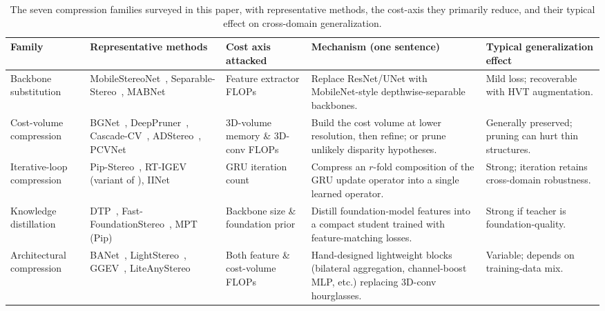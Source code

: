 \begin{table}[!htbp]
\centering
\caption{The seven compression families surveyed in this paper, with representative methods, the cost-axis they primarily reduce, and their typical effect on cross-domain generalization.}
\label{tab:compression_families}
\renewcommand{\arraystretch}{1.15}
\footnotesize
\begin{tabular}{p{2.6cm}p{4.0cm}p{2.4cm}p{4.0cm}p{2.6cm}}
\toprule
\textbf{Family} & \textbf{Representative methods} & \textbf{Cost axis attacked} & \textbf{Mechanism (one sentence)} & \textbf{Typical generalization effect} \\
\midrule
Backbone substitution &
MobileStereoNet~\cite{shamsafar2022mobilestereonet}, Separable-Stereo~\cite{rahim2021separable}, MABNet~\cite{xing2020mabnet} &
Feature extractor FLOPs &
Replace ResNet/UNet with MobileNet-style depthwise-separable backbones. &
Mild loss; recoverable with HVT augmentation. \\
\midrule
Cost-volume compression &
BGNet~\cite{xu2021bgnet}, DeepPruner~\cite{duggal2019deeppruner}, Cascade-CV~\cite{gu2020cascade}, ADStereo~\cite{wang2023adstereo}, PCVNet~\cite{zeng2023pcvnet} &
3D-volume memory \& 3D-conv FLOPs &
Build the cost volume at lower resolution, then refine; or prune unlikely disparity hypotheses. &
Generally preserved; pruning can hurt thin structures. \\
\midrule
Iterative-loop compression &
Pip-Stereo~\cite{zheng2026pipstereo}, RT-IGEV (variant of \cite{xu2023igev}), IINet~\cite{li2024iinet} &
GRU iteration count &
Compress an $r$-fold composition of the GRU update operator into a single learned operator. &
Strong; iteration retains cross-domain robustness. \\
\midrule
Knowledge distillation &
DTP~\cite{pan2024dtp}, Fast-FoundationStereo~\cite{wen2026fastfoundationstereo}, MPT (Pip)~\cite{zheng2026pipstereo} &
Backbone size \& foundation prior &
Distill foundation-model features into a compact student trained with feature-matching losses. &
Strong if teacher is foundation-quality. \\
\midrule
Architectural compression &
BANet~\cite{xu2025banet}, LightStereo~\cite{guo2025lightstereo}, GGEV~\cite{liu2026ggev}, LiteAnyStereo~\cite{jing2025liteanystereo} &
Both feature \& cost-volume FLOPs &
Hand-designed lightweight blocks (bilateral aggregation, channel-boost MLP, etc.) replacing 3D-conv hourglasses. &
Variable; depends on training-data mix. \\

\end{tabular}
\end{table}
